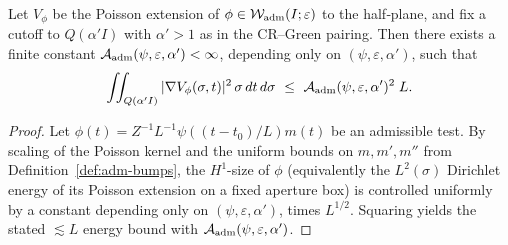 \begin{lemma}\label{lem:uniform-test-energy}
Let \(V_\phi\) be the Poisson extension of \(\phi\in\mathcal W_{\rm adm}(I;\varepsilon)\) to the half‑plane, and fix a cutoff to \(Q(\alpha' I)\) with \(\alpha'>1\) as in the CR--Green pairing.
Then there exists a finite constant \(\mathcal A_{\rm adm}(\psi,\varepsilon,\alpha')<\infty\), depending only on \((\psi,\varepsilon,\alpha')\), such that
\[
  \iint_{Q(\alpha' I)} |\nabla V_\phi(\sigma,t)|^2\,\sigma\,dt\,d\sigma\ \le\ \mathcal A_{\rm adm}(\psi,\varepsilon,\alpha')^2\; L.
\]
\end{lemma}
\begin{proof}
Let \(\phi(t)=Z^{-1}L^{-1}\psi((t-t_0)/L)m(t)\) be an admissible test.
By scaling of the Poisson kernel and the uniform bounds on \(m,m',m''\) from Definition~\ref{def:adm-bumps}, the \(H^1\)-size of \(\phi\) (equivalently the \(L^2(\sigma)\) Dirichlet energy of its Poisson extension on a fixed aperture box) is controlled uniformly by a constant depending only on \((\psi,\varepsilon,\alpha')\), times \(L^{1/2}\).
Squaring yields the stated \(\lesssim L\) energy bound with \(\mathcal A_{\rm adm}(\psi,\varepsilon,\alpha')\).
\end{proof}

